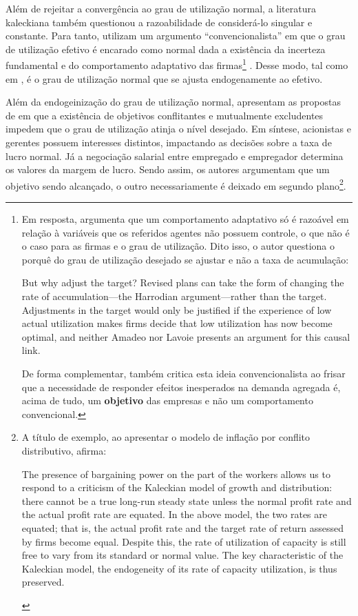 Além de rejeitar a convergência ao grau de utilização normal, a literatura kaleckiana também questionou a razoabilidade de considerá-lo singular e constante. 
Para tanto, utilizam um argumento ``convencionalista'' em que o grau de utilização efetivo é encarado como normal dada a existência da incerteza fundamental e do comportamento adaptativo das firmas\footnote{
	Em resposta, \textcite{skott_theoretical_2012} argumenta que um comportamento adaptativo só é razoável em relação à variáveis que os referidos agentes não possuem controle, o que não é o caso para as firmas e o grau de utilização. Dito isso, o autor questiona o porquê do grau de utilização desejado se ajustar e não a taxa de acumulação:
	
	\begin{citacao}
		But why adjust the target? Revised plans can take the form of changing the rate of accumulation—the Harrodian argument—rather than the target. Adjustments in the target would only be justified if the experience of low actual utilization makes firms decide that low utilization has now become optimal, and neither Amadeo nor Lavoie presents an argument for this causal link. \cite[p.120]{skott_theoretical_2012}
	\end{citacao}
	De forma complementar, \textcite{nikiforos_utilization_2016} também critica esta ideia convencionalista ao frisar que a necessidade de responder efeitos inesperados na demanda agregada é, acima de tudo, um \textbf{objetivo} das empresas e não um comportamento convencional. 
} \cite{lavoie_kaleckian_1995}. Desse modo, tal como em \textcite{amadeo_role_1986}, é o grau de utilização normal que se ajusta endogenamente ao efetivo. 

Além da endogeinização do grau de utilização normal, \textcite{hein_harrodian_2012} apresentam as propostas de \textcite{dallery_conflicting_2011} em que a existência de objetivos conflitantes e mutualmente excludentes impedem que o grau de utilização atinja o nível desejado. Em síntese, acionistas e gerentes possuem interesses distintos, impactando as decisões sobre a taxa de lucro normal. Já a negociação salarial entre empregado e empregador determina os valores da margem de lucro. Sendo assim, os autores argumentam que um objetivo sendo alcançado, o outro necessariamente é deixado em segundo plano\footnote{
	A título de exemplo, ao apresentar o modelo de inflação por conflito distributivo, \textcite[p.~567]{lavoie_post-keynesian_2015} afirma:
	
	\begin{citacao}
		The presence of bargaining power on the part of the workers allows
		us to respond to a criticism of the Kaleckian model of growth and distribution: there
		cannot be a true long-run steady state unless the normal profit rate and the actual profit
		rate are equated. In the above model, the two rates are equated; that is, the actual profit
		rate and the target rate of return assessed by firms become equal. Despite this, the rate
		of utilization of capacity is still free to vary from its standard or normal value. The key
		characteristic of the Kaleckian model, the endogeneity of its rate of capacity utilization,
		is thus preserved.
	\end{citacao}
}.

